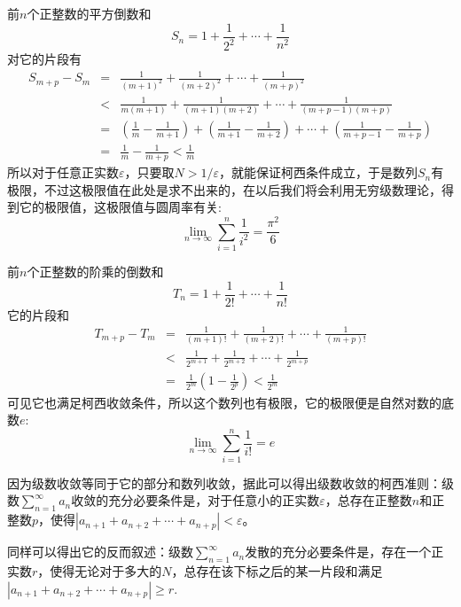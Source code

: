 \begin{example}
  前$n$个正整数的平方倒数和
  \[ S_n = 1 + \frac{1}{2^2} + \cdots + \frac{1}{n^2} \]
  对它的片段有
  \begin{eqnarray*}
    S_{m+p}-S_m  & = & \frac{1}{(m+1)^2} + \frac{1}{(m+2)^2} + \cdots + \frac{1}{(m+p)^2} \\
                 & < & \frac{1}{m(m+1)} + \frac{1}{(m+1)(m+2)} + \cdots + \frac{1}{(m+p-1)(m+p)} \\
                 & = & \left( \frac{1}{m} - \frac{1}{m+1} \right) + \left( \frac{1}{m+1} - \frac{1}{m+2} \right) + \cdots + \left( \frac{1}{m+p-1} - \frac{1}{m+p} \right) \\
    & = & \frac{1}{m} - \frac{1}{m+p} < \frac{1}{m}
  \end{eqnarray*}
  所以对于任意正实数$\varepsilon$，只要取$N>1/\varepsilon$，就能保证柯西条件成立，于是数列$S_n$有极限，不过这极限值在此处是求不出来的，在以后我们将会利用无穷级数理论，得到它的极限值，这极限值与圆周率有关:
  \[ \lim_{n \to \infty} \sum_{i=1}^n \frac{1}{i^2} = \frac{\pi^2}{6} \]
\end{example}

\begin{example}
  前$n$个正整数的阶乘的倒数和
  \[ T_n = 1 + \frac{1}{2!} + \cdots + \frac{1}{n!} \]
  它的片段和
  \begin{eqnarray*}
    T_{m+p} - T_m & = & \frac{1}{(m+1)!} + \frac{1}{(m+2)!} + \cdots + \frac{1}{(m+p)!} \\
                  & < & \frac{1}{2^{m+1}} + \frac{1}{2^{m+2}} + \cdots + \frac{1}{2^{m+p}} \\
    & = & \frac{1}{2^m} \left( 1-\frac{1}{2^p} \right) < \frac{1}{2^m}
  \end{eqnarray*}
  可见它也满足柯西收敛条件，所以这个数列也有极限，它的极限便是自然对数的底数$e$:
  \[ \lim_{n \to \infty} \sum_{i=1}^n \frac{1}{i!} = e \]
\end{example}

\begin{example}[级数收敛的柯西准则]
  因为级数收敛等同于它的部分和数列收敛，据此可以得出级数收敛的柯西准则：级数$\sum_{n=1}^{\infty} a_n$收敛的充分必要条件是，对于任意小的正实数$\varepsilon$，总存在正整数$n$和正整数$p$，使得$|a_{n+1}+a_{n+2} + \cdots + a_{n+p}|<\varepsilon$。

  同样可以得出它的反而叙述：级数$\sum_{n=1}^{\infty} a_n$发散的充分必要条件是，存在一个正实数$r$，使得无论对于多大的$N$，总存在该下标之后的某一片段和满足$|a_{n+1}+a_{n+2}+\cdots+a_{n+p}| \geqslant r$.
\end{example}

